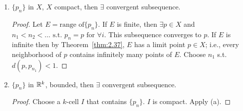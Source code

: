 \begin{thm}[6]
	\begin{enumerate}
		\item $\{p_n\}$ in $X$, $X$ compact, then $\exists$ convergent subsequence.
		      \begin{proof}
			      Let $E=\text{range of} \{p_n\} $. If $E$ is finite, then $\exists {p\in X}$ and $n_1<n_2<\ldots \text{ s.t. } p_n=p \text{ for } \forall i$. This subsequence converges to $p$. If $E$ is infinite then by Theorem~\ref{thm:2.37}, $E$ has a limit point $p \in X$; i.e., every neighborhood of $p$ contains infinitely many points of $E$. Choose $n_1$ s.t. $d(p,p_{n_1})<1$.

		      \end{proof}

		\item $\{ p_n \} $ in $\mathbb{R}^{k}$, bounded, then $\exists$ convergent subsequence.
		      \begin{proof}
			      Choose a $k$-cell $I$ that contains $\{p_{n}\} $. $I$ is compact. Apply (a).

		      \end{proof}

	\end{enumerate}
\end{thm}

